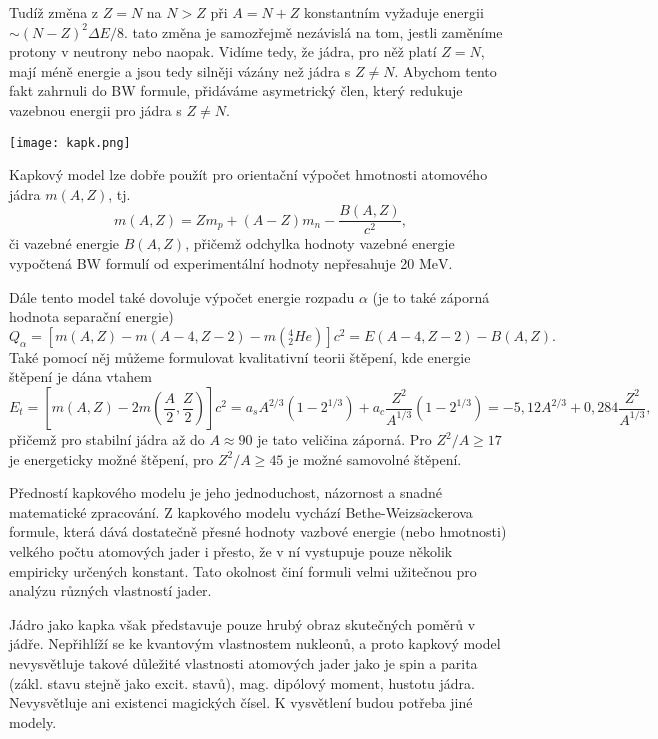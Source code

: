 \documentclass[../../main.tex]{subfiles}
\begin{document}
Tudíž změna z $Z=N$ na $N>Z$ při $A = N+Z$ konstantním vyžaduje energii $\sim (N-Z)^2 \Delta E/8$. tato změna je samozřejmě nezávislá na tom, jestli zaměníme protony v neutrony nebo naopak. Vidíme tedy, že jádra, pro něž platí $Z=N$, mají méně energie a jsou tedy silněji vázány než jádra s $Z \neq N$. Abychom tento fakt zahrnuli do BW formule, přidáváme asymetrický člen, který redukuje vazebnou energii pro jádra s $Z \neq N$. 

\begin{center}
	\texttt{[image: kapk.png]}
\end{center}

Kapkový model lze dobře použít pro orientační výpočet hmotnosti atomového jádra $m(A,Z)$, tj.
\begin{equation}
m(A,Z) = Z m_p + (A -Z)m_n - \dfrac{B(A,Z)}{c^2},
\end{equation}
či vazebné energie $B(A,Z)$, přičemž odchylka hodnoty vazebné energie vypočtená BW formulí od experimentální hodnoty nepřesahuje 20 $\mathrm{MeV}$.

Dále tento model také dovoluje výpočet energie rozpadu $\alpha$ (je to také záporná hodnota separační energie)
\begin{equation}
Q_{\alpha} = \left[ m(A,Z) - m(A-4,Z-2) - m(^{4}_{2}He)\right] c^2 = E(A-4, Z-2) - B(A,Z).
\end{equation}
Také pomocí něj můžeme formulovat kvalitativní teorii štěpení, kde energie štěpení je dána vtahem
\begin{equation}
E_t = \left[ m(A,Z) - 2m (\dfrac{A}{2}, \dfrac{Z}{2})\right] c^2 = a_s A^{2/3} (1 - 2^{1/3}) + a_c \dfrac{Z^2}{A^{1/3}} (1 - 2^{1/3}) = - 5,12 A^{2/3} + 0,284 \dfrac{Z^2}{A^{1/3}},
\end{equation}
přičemž pro stabilní jádra až do $A\approx90$ je tato veličina záporná. Pro $Z^2/A \geq 17$ je energeticky možné štěpení, pro $Z^2 /A \geq 45$ je možné samovolné štěpení.

Předností kapkového modelu je jeho jednoduchost, názornost a snadné matematické zpracování. Z kapkového modelu vychází Bethe-Weizs$\ddot{a}$ckerova formule, která dává dostatečně přesné hodnoty vazbové energie (nebo hmotnosti) velkého počtu atomových jader i přesto, že v ní vystupuje pouze několik empiricky určených konstant. Tato okolnost činí formuli velmi užitečnou pro analýzu různých vlastností jader.

Jádro jako kapka však představuje pouze hrubý obraz skutečných poměrů v jádře. Nepřihlíží se ke kvantovým vlastnostem nukleonů, a proto kapkový model nevysvětluje takové důležité vlastnosti atomových jader jako je spin a parita (zákl. stavu stejně jako excit. stavů), mag. dipólový moment, hustotu jádra. Nevysvětluje ani existenci magických čísel. K vysvětlení budou potřeba jiné modely. 
\end{document}
